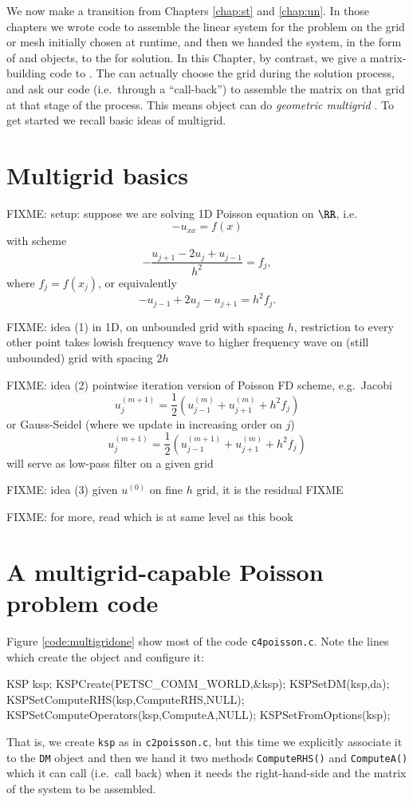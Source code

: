 
We now make a transition from Chapters \ref{chap:st} and \ref{chap:un}.  In those chapters we wrote code to assemble the linear system for the problem on the grid or mesh initially chosen at runtime, and then we handed the system, in the form of \pMat and \pVec objects, to the \pKSP for solution.  In this Chapter, by contrast, we give a matrix-building code to \pKSP.  The \pKSP can actually choose the grid during the solution process, and ask our code (i.e.~through a ``call-back'') to assemble the matrix on that grid at that stage of the process.  This means \PETSc \pKSP object can do \emph{geometric multigrid} \citep{Briggsetal2000}.  To get started we recall basic ideas of multigrid.


\section{Multigrid basics}

FIXME: setup: suppose we are solving 1D Poisson equation on $\RR$, i.e.
    $$- u_{xx} = f(x)$$
with scheme
    $$- \frac{u_{j+1} - 2 u_j + u_{j-1}}{h^2} = f_j,$$
where $f_j = f(x_j)$, or equivalently
    $$- u_{j-1} + 2 u_j - u_{j+1} = h^2 f_j.$$

FIXME: idea (1) in 1D, on unbounded grid with spacing $h$, restriction to every other point takes lowish frequency wave to higher frequency wave on (still unbounded) grid with spacing $2h$

FIXME: idea (2) pointwise iteration version of Poisson FD scheme, e.g.~Jacobi
   $$u_j^{(m+1)} = \frac{1}{2} \left(u_{j-1}^{(m)} + u_{j+1}^{(m)} + h^2 f_j\right) $$
or Gauss-Seidel (where we update in increasing order on $j$)
   $$u_j^{(m+1)} = \frac{1}{2} \left(u_{j-1}^{(m+1)} + u_{j+1}^{(m)} + h^2 f_j\right) $$
will serve as low-pass filter on a given grid

FIXME: idea (3) given $u^{(0)}$ on fine $h$ grid, it is the residual FIXME

FIXME: for more, read \citep{Briggsetal2000} which is at same level as this book


\section{A multigrid-capable Poisson problem code}

Figure \ref{code:multigridone} show most of the code \texttt{c4poisson.c}.  Note the lines which create the \pKSP object and configure it:
\begin{code}
  KSP ksp;
  KSPCreate(PETSC_COMM_WORLD,&ksp);
  KSPSetDM(ksp,da);
  KSPSetComputeRHS(ksp,ComputeRHS,NULL);
  KSPSetComputeOperators(ksp,ComputeA,NULL);
  KSPSetFromOptions(ksp);
\end{code}
That is, we create \texttt{ksp} as in \texttt{c2poisson.c}, but this time we explicitly associate it to the \texttt{DM} object and then we hand it two methods \texttt{ComputeRHS()} and \texttt{ComputeA()} which it can call (i.e.~call back) when it needs the right-hand-side and the matrix of the system to be assembled.

